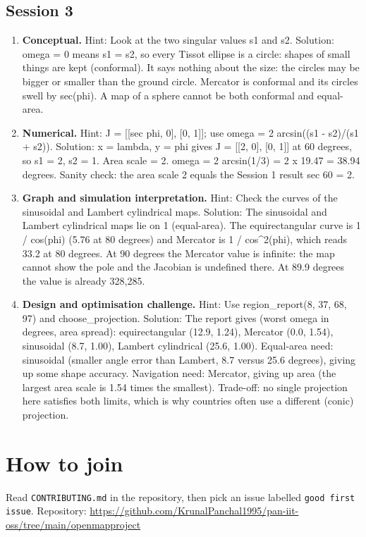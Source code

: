 \documentclass[11pt,a4paper]{article}
\begin{document}
\subsection*{Session 3}
\begin{enumerate}[nosep]
\item \textbf{Conceptual.} Hint: Look at the two singular values s1 and s2. Solution: omega = 0 means s1 = s2, so every Tissot ellipse is a circle: shapes of small things are kept (conformal). It says nothing about the size: the circles may be bigger or smaller than the ground circle. Mercator is conformal and its circles swell by sec(phi). A map of a sphere cannot be both conformal and equal-area.
\item \textbf{Numerical.} Hint: J = [[sec phi, 0], [0, 1]]; use omega = 2 arcsin((s1 - s2)/(s1 + s2)). Solution: x = lambda, y = phi gives J = [[2, 0], [0, 1]] at 60 degrees, so s1 = 2, s2 = 1. Area scale = 2. omega = 2 arcsin(1/3) = 2 x 19.47 = 38.94 degrees. Sanity check: the area scale 2 equals the Session 1 result sec 60 = 2.
\item \textbf{Graph and simulation interpretation.} Hint: Check the curves of the sinusoidal and Lambert cylindrical maps. Solution: The sinusoidal and Lambert cylindrical maps lie on 1 (equal-area). The equirectangular curve is 1 / cos(phi) (5.76 at 80 degrees) and Mercator is 1 / cos\textasciicircum{}2(phi), which reads 33.2 at 80 degrees. At 90 degrees the Mercator value is infinite: the map cannot show the pole and the Jacobian is undefined there. At 89.9 degrees the value is already 328,285.
\item \textbf{Design and optimisation challenge.} Hint: Use region\_report(8, 37, 68, 97) and choose\_projection. Solution: The report gives (worst omega in degrees, area spread): equirectangular (12.9, 1.24), Mercator (0.0, 1.54), sinusoidal (8.7, 1.00), Lambert cylindrical (25.6, 1.00). Equal-area need: sinusoidal (smaller angle error than Lambert, 8.7 versus 25.6 degrees), giving up some shape accuracy. Navigation need: Mercator, giving up area (the largest area scale is 1.54 times the smallest). Trade-off: no single projection here satisfies both limits, which is why countries often use a different (conic) projection.
\end{enumerate}

\section{How to join}
Read \texttt{CONTRIBUTING.md} in the repository, then pick an issue labelled \texttt{good first issue}. Repository: \url{https://github.com/KrunalPanchal1995/pan-iit-oss/tree/main/openmapproject}
\end{document}
